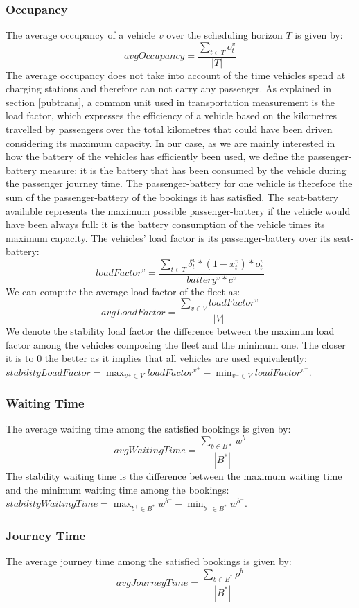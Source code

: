 \documentclass[12pt,a4paper]{article}
\begin{document}
\subsubsection*{Occupancy}
The average occupancy of a vehicle $v$ over the scheduling horizon $T$ is given by:
$$avgOccupancy = \frac{\sum_{t \in T}o^{v}_{t}}{|T|}$$
The average occupancy does not take into account of the time vehicles spend at charging stations and therefore can not carry any passenger. As explained in section \ref{pubtrans}, a common unit used in transportation  measurement is the load factor, which expresses the efficiency of a vehicle based on the kilometres travelled by passengers over the total kilometres that could have been driven considering its maximum capacity. In our case, as we are mainly interested in how the battery of the vehicles has efficiently been used, we define the passenger-battery measure: it is the battery that has been consumed by the vehicle during the passenger journey time. The passenger-battery for one vehicle is therefore the sum of the passenger-battery of the bookings it has satisfied. The seat-battery available represents the maximum possible passenger-battery if the vehicle would have been always full: it is the battery consumption of the vehicle times its maximum capacity. The vehicles' load factor is its passenger-battery over its seat-battery:
$$loadFactor^{v} = \frac{\sum_{t \in T} \delta^{v}_{t} * (1-x^{v}_{t}) * o^{v}_{t}}{battery^{v} * c^{v}}$$
We can compute the average load factor of the fleet as:
$$avgLoadFactor = \frac{\sum_{v \in V}loadFactor^{v}}{|V|}$$
We denote the stability load factor the difference between the maximum load factor among the vehicles composing the fleet and the minimum one. The closer it is to 0 the better as it implies that all vehicles are used equivalently: $stabilityLoadFactor = \max_{v^{+} \in V}{loadFactor^{v^{+}}} -  \min_{v^{-} \in V}{loadFactor^{v^{-}}}$.
\subsubsection*{Waiting Time}
The average waiting time among the satisfied bookings is given by: 
$$avgWaitingTime = \frac{\sum_{b \in B{*}}w^{b}}{|B^{*}|} $$
The stability waiting time is the difference between the maximum waiting time and the minimum waiting time among the bookings:  $stabilityWaitingTime = \max_{b^{+} \in B^{*}}{w^{b^{+}}} -  \min_{b^{-} \in B^{*}}{w^{b^{-}}}$.
\subsubsection*{Journey Time}
The average journey time among the satisfied bookings is given by:
$$avgJourneyTime = \frac{\sum_{b \in B^{*}}\rho^{b}}{|B^{*}|} $$
\end{document}
